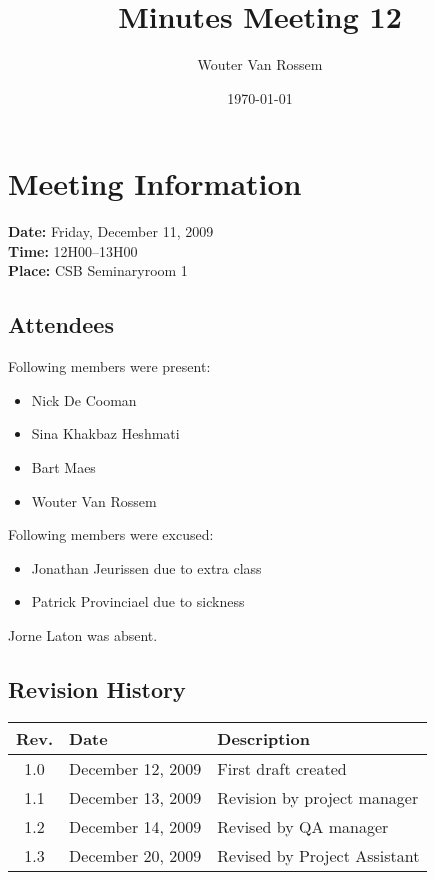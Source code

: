 \documentclass[a4paper, 12pt]{article}
\begin{document}
\title{Minutes Meeting 12}
\author{Wouter Van Rossem}
\date{\today}

\maketitle	
	\section{Meeting Information}
		\textbf{Date:} Friday, December 11, 2009\\
		\textbf{Time:} 12H00--13H00\\
		\textbf{Place:} CSB Seminaryroom 1\\
		\subsection{Attendees}
Following members were present:
			\begin{itemize}
				\item Nick De Cooman
				\item Sina Khakbaz Heshmati
				\item Bart Maes
				\item Wouter Van Rossem
			\end{itemize}
Following members were excused:
			\begin{itemize}
				\item Jonathan Jeurissen due to extra class
				\item Patrick Provinciael due to sickness
			\end{itemize}
Jorne Laton	was absent.		
			
		\subsection{Revision History}
			\begin{tabular}{c | l | l }
				\textbf{Rev.} & \textbf{Date} & \textbf{Description} \\
				\hline
				1.0 & December 12, 2009 & First draft created \\
				1.1 & December 13, 2009 & Revision by project manager \\
				1.2 & December 14, 2009 & Revised by QA manager \\
				1.3 & December 20, 2009 & Revised by Project Assistant \\
				

			\end{tabular}		
	
\end{document}
